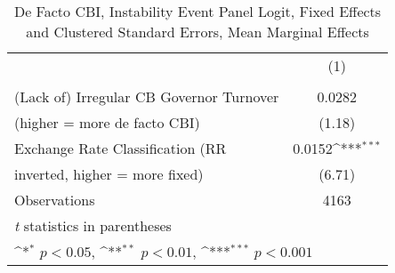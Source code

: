 \begin{table}[htbp]\centering
\def\sym#1{\ifmmode^{#1}\else\(^{#1}\)\fi}
\caption{De Facto CBI, Instability Event Panel Logit, Fixed Effects and Clustered Standard Errors, Mean Marginal Effects \label{margsJustBinInstabEventDJ}}
\begin{tabular}{l*{1}{c}}
\toprule
                                        &\multicolumn{1}{c}{(1)}\\
                                        &\multicolumn{1}{c}{}\\
\midrule
(Lack of) Irregular CB Governor Turnover&    0.0282         \\
(higher = more de facto CBI)            &    (1.18)         \\
\addlinespace
Exchange Rate Classification (RR        &    0.0152\sym{***}\\
inverted, higher = more fixed)          &    (6.71)         \\
\midrule
Observations                            &      4163         \\
\bottomrule
\multicolumn{2}{l}{\footnotesize \textit{t} statistics in parentheses}\\
\multicolumn{2}{l}{\footnotesize \sym{*} \(p<0.05\), \sym{**} \(p<0.01\), \sym{***} \(p<0.001\)}\\
\end{tabular}
\end{table}
